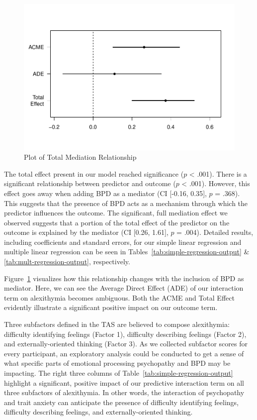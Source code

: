 \documentclass[
  man,floatsintext]{apa7}
\begin{document}
\begin{figure}
\includegraphics[width=1\linewidth]{d2m-Psychopathy_files/figure-latex/mediation-plot-1} \caption{Plot of Total Mediation Relationship}\label{fig:mediation-plot}
\end{figure}

The total effect present in our model reached significance (\(p\) \textless{} .001). There is a significant relationship between predictor and outcome (\(p\) \textless{} .001). However, this effect goes away when adding BPD as a mediator (CI {[}-0.16, 0.35{]}, \(p\) = .368). This suggests that the presence of BPD acts as a mechanism through which the predictor influences the outcome. The significant, full mediation effect we observed suggests that a portion of the total effect of the predictor on the outcome is explained by the mediator (CI {[}0.26, 1.61{]}, \(p\) = .004). Detailed results, including coefficients and standard errors, for our simple linear regression and multiple linear regression can be seen in Tables~\ref{tab:simple-regression-output} \& \ref{tab:mult-regression-output}, respectively.

Figure~\ref{fig:mediation-plot} visualizes how this relationship changes with the inclusion of BPD as mediator. Here, we can see the Average Direct Effect (ADE) of our interaction term on alexithymia becomes ambiguous. Both the ACME and Total Effect evidently illustrate a significant positive impact on our outcome term.

Three subfactors defined in the TAS are believed to compose alexithymia: difficulty identifying feelings (Factor 1), difficulty describing feelings (Factor 2), and externally-oriented thinking (Factor 3). As we collected subfactor scores for every participant, an exploratory analysis could be conducted to get a sense of what specific parts of emotional processing psychopathy and BPD may be impacting. The right three columns of Table~\ref{tab:simple-regression-output} highlight a significant, positive impact of our predictive interaction term on all three subfactors of alexithymia. In other words, the interaction of psychopathy and trait anxiety can anticipate the presence of difficulty identifying feelings, difficulty describing feelings, and externally-oriented thinking.
\end{document}
